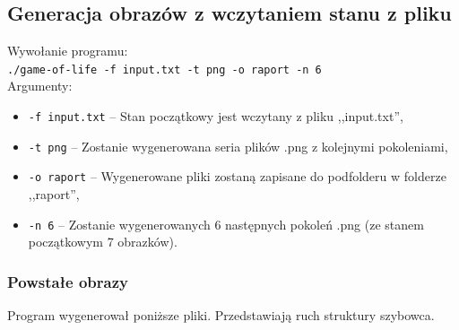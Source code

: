 \documentclass{mwart}
\begin{document}
\subsection{Generacja obrazów z wczytaniem stanu z pliku}
\noindent{}Wywołanie programu: \\
\texttt{./game-of-life -f input.txt -t png -o raport -n 6} \\
Argumenty:
\begin{itemize}
\item \texttt{-f input.txt} -- Stan początkowy jest wczytany z pliku ,,input.txt'',
\item \texttt{-t png} -- Zostanie wygenerowana seria plików .png z kolejnymi pokoleniami,
\item \texttt{-o raport} -- Wygenerowane pliki zostaną zapisane do podfolderu w folderze ,,raport'',
\item \texttt{-n 6} -- Zostanie wygenerowanych 6 następnych pokoleń .png (ze stanem początkowym 7 obrazków).
\end{itemize}

\subsubsection*{Powstałe obrazy}
Program wygenerował poniższe pliki. Przedstawiają ruch struktury szybowca.
\end{document}
